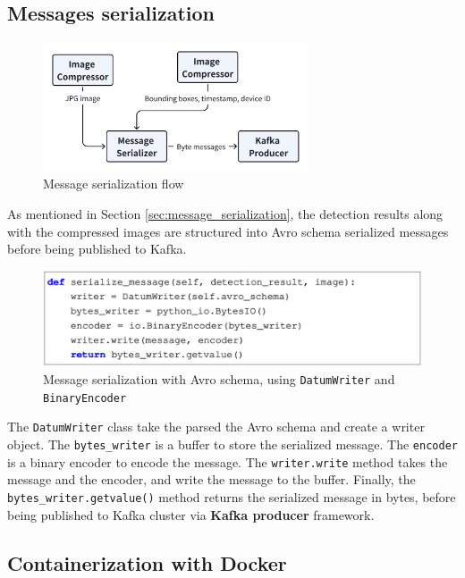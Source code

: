 \subsection{Messages serialization}
\label{sec:edge_message_serialization}

\begin{figure}[htbp]
    \centering
    \includegraphics[width=0.7\textwidth]{Figure/edge_mess.png}
    \caption{Message serialization flow}
    \label{fig:edge_mess}
\end{figure}

As mentioned in Section \ref{sec:message_serialization}, the detection results along with the compressed images are structured into Avro schema serialized messages before being published to Kafka.

\begin{figure}[htbp]
    \centering
    \includegraphics[width=1\textwidth]{Figure/avro_code.png}
    \caption{Message serialization with Avro schema, using \texttt{DatumWriter} and \texttt{BinaryEncoder}}
    \label{fig:avro_code}
\end{figure}

The \texttt{DatumWriter} class take the parsed the Avro schema and create a writer object. The \texttt{bytes\_writer} is a buffer to store the serialized message. The \texttt{encoder} is a binary encoder to encode the message. The \texttt{writer.write} method takes the message and the encoder, and write the message to the buffer. Finally, the \texttt{bytes\_writer.getvalue()} method returns the serialized message in bytes, before being published to Kafka cluster via \textbf{Kafka producer} framework.

\subsection{Containerization with Docker}
\label{sec:edge_containerization}


